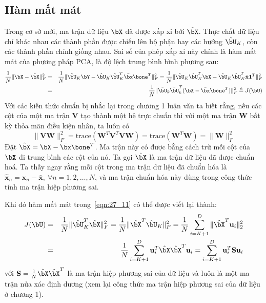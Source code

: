 \subsection{Hàm mất mát}
Trong cơ sở mới, ma trận dữ liệu $\bX$ đã được xấp xỉ bởi $\tilde{\bX}$.  Thực chất dữ liệu chỉ khác nhau các thành phần được chiếu lên bộ phận hay các hướng $\hat{\bU}_K$, còn các thành phần chính giống nhau. Sai số của phép xấp xỉ này chính là hàm mất mát của phương pháp PCA, là độ lệch trung bình bình phương sau: 
\begin{eqnarray}
\nonumber
\frac{1}{N}\|\bX - \tilde{\bX}\|_F^2 &=&
\frac{1}{N}\|\hat{\bU}_K \bY-  \hat{\bU}_K
\hat{\bU}_K^T\bar{\bx}\bone^T\|_F^2 =
\frac{1}{N}\|\hat{\bU}_K \hat{\bU}_K^T \bX -  \hat{\bU}_K
\hat{\bU}_K^T \bar{\mathbf{x}}\mathbf{1}^T\|_F^2\\
\label{eqn:27_11}
&=& \frac{1}{N} \|\hat{\bU}_k \hat{\bU}_k^T(\bX - \bar{\bx}\bone^T)\|_F^2
\triangleq J(\bU)
\end{eqnarray}
Với các kiến thức chuẩn bị nhắc lại trong chương 1 luận văn ta biết rằng, nếu các cột của một ma trận $\mathbf{V}$ tạo thành một hệ trực chuẩn thì với một ma trận $\mathbf{W}$ bất kỳ thỏa mãn điều kiện nhân, ta luôn có
\begin{equation}
\|\mathbf{VW}\|_F^2 = \text{trace} (\mathbf{W}^T\mathbf{V}^T\mathbf{V} \mathbf{W}) = \text{trace}(\mathbf{W}^T\mathbf{W}) = \|\mathbf{W}\|_F^2
\end{equation}
Đặt $\hat{\bX} = \bX - \bar{\bx}\bone^T$. Ma trận này có được bằng cách trừ
mỗi cột của $\bX$ đi trung bình các cột của nó. Ta gọi $\hat{\bX}$ là {ma trận dữ liệu đã
	được chuẩn hoá}. Ta thấy ngay rằng mỗi cột trong ma trận dữ liệu đã chuẩn hóa là $\hat{\mathbf{x}}_n = \mathbf{x}_n -
\bar{\mathbf{x}},~\forall n = 1, 2, \dots, N$, và ma trận chuẩn hóa này dùng trong công thức tính ma trận hiệp phương sai.


Khi đó hàm mất mát trong~\eqref{eqn:27_11} có thể được viết lại thành:
\begin{eqnarray}
J(\bU) &=&  \frac{1}{N} \|\hat{\bU}_K^T\hat{\bX} \|_F^2 = \frac{1}{N}
\|\hat{\bX}^T \hat{\bU}_K \|_F^2 =
\frac{1}{N}\sum_{i = K+1}^D \|\hat{\bX}^T\mathbf{u}_i \|_2^2 \\\
\label{eqn:27_12}
&=& \frac{1}{N} \sum_{i=K+1}^D \mathbf{u}_i^T\hat{\bX}\hat{\bX}^T \mathbf{u}_i
= \sum_{i=K+1}^D \mathbf{u}_i^T\mathbf{S} \mathbf{u}_i
\end{eqnarray}
với $\mathbf{S} = \frac{1}{N}\hat{\bX}\hat{\bX}^T$ là ma trận hiệp phương sai
của dữ liệu và luôn là một ma trận nửa xác định dương (xem lại công thức ma trận hiệp phương sai của dữ liệu ở chương 1).

